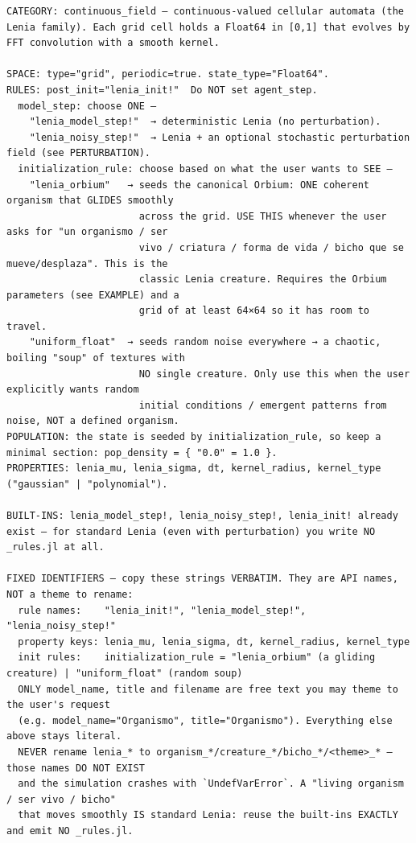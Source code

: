 \begin{lstlisting}[style=cellprompt]
CATEGORY: continuous_field — continuous-valued cellular automata (the Lenia family). Each grid cell holds a Float64 in [0,1] that evolves by FFT convolution with a smooth kernel.

SPACE: type="grid", periodic=true. state_type="Float64".
RULES: post_init="lenia_init!"  Do NOT set agent_step.
  model_step: choose ONE —
    "lenia_model_step!"  → deterministic Lenia (no perturbation).
    "lenia_noisy_step!"  → Lenia + an optional stochastic perturbation field (see PERTURBATION).
  initialization_rule: choose based on what the user wants to SEE —
    "lenia_orbium"   → seeds the canonical Orbium: ONE coherent organism that GLIDES smoothly
                       across the grid. USE THIS whenever the user asks for "un organismo / ser
                       vivo / criatura / forma de vida / bicho que se mueve/desplaza". This is the
                       classic Lenia creature. Requires the Orbium parameters (see EXAMPLE) and a
                       grid of at least 64×64 so it has room to travel.
    "uniform_float"  → seeds random noise everywhere → a chaotic, boiling "soup" of textures with
                       NO single creature. Only use this when the user explicitly wants random
                       initial conditions / emergent patterns from noise, NOT a defined organism.
POPULATION: the state is seeded by initialization_rule, so keep a minimal section: pop_density = { "0.0" = 1.0 }.
PROPERTIES: lenia_mu, lenia_sigma, dt, kernel_radius, kernel_type ("gaussian" | "polynomial").

BUILT-INS: lenia_model_step!, lenia_noisy_step!, lenia_init! already exist — for standard Lenia (even with perturbation) you write NO _rules.jl at all.

FIXED IDENTIFIERS — copy these strings VERBATIM. They are API names, NOT a theme to rename:
  rule names:    "lenia_init!", "lenia_model_step!", "lenia_noisy_step!"
  property keys: lenia_mu, lenia_sigma, dt, kernel_radius, kernel_type
  init rules:    initialization_rule = "lenia_orbium" (a gliding creature) | "uniform_float" (random soup)
  ONLY model_name, title and filename are free text you may theme to the user's request
  (e.g. model_name="Organismo", title="Organismo"). Everything else above stays literal.
  NEVER rename lenia_* to organism_*/creature_*/bicho_*/<theme>_* — those names DO NOT EXIST
  and the simulation crashes with `UndefVarError`. A "living organism / ser vivo / bicho"
  that moves smoothly IS standard Lenia: reuse the built-ins EXACTLY and emit NO _rules.jl.


\end{lstlisting}
